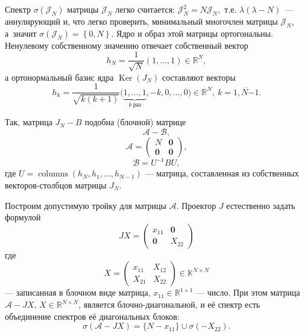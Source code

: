 \documentclass[12pt]{article}
\begin{document}
Спектр \( \sigma\left( \mathcal{J}_N \right) \)
    матрицы \( \mathcal{J}_N \) легко считается:
    \( \mathcal{J}_N^2 = N \mathcal{J}_N, \) т.е.
    \( \lambda(\lambda - N) \)~--- аннулирующий и, что легко проверить,
    минимальный многочлен матрицы \( \mathcal{J}_N \), а~значит
    \( \sigma\left( \mathcal{J}_N \right) = \left\{ 0,N \right\}. \)
Ядро и образ этой матрицы ортогональны.
Ненулевому собственному значению
    отвечает собственный вектор
    \[
        h_N = \frac{1}{\sqrt{N}}(1,\ldots, 1)\in\mathbb{R}^N,
        \]
    а ортонормальный базис ядра \( \operatorname{Ker}(J_N) \)
    составляют векторы
    \[
        h_k = \frac{1}{\sqrt{k(k+1)}}
        \big(\underbrace{1,\ldots, 1}_{k\ \text{раз}}, -k, 0, \ldots, 0\big)
        \in\mathbb{R}^N,
        \ k=\overline{1,N{-1}}.
        \]

Так, матрица \( J_N-B \) подобна (блочной) матрице
    \[
        \mathcal{A} - \mathcal{B}, \]
    \[
        \mathcal{A} = \left(\begin{array}{c|c}
        N & \mathbf{0} \\ \hline
        \mathbf{0} & \mathbf{0}
        \end{array}\right),
        \]
    \[
        \mathcal{B} = U^{-1}B U,
        \]
    где \( U=\operatorname{columns}(h_N, h_1, \ldots, h_{N-1}) \)
    --- матрица, составленная из собственных векторов-столбцов матрицы \( J_N \).

Построим допустимую тройку для матрицы \( \mathcal{A} \).
Проектор \( J \) естественно задать формулой
    \[
        JX =
        \left(\begin{array}{c|c}
        x_{11} & \mathbf{0} \\ \hline
        \mathbf{0} & X_{22}
        \end{array}\right)
        \]
где
    \[
        X =
        \left(\begin{array}{c|c}
        x_{11} & X_{12} \\ \hline
        X_{21} & X_{22}
        \end{array}\right)\in\mathbb{K}^{N{\times}N}
        \]
        --- записанная в блочном виде матрица,
        \( x_{11}\in\mathbb{R}^{1\times 1} \) --- число.
При этом матрица \( \mathcal{A} - JX \),
    \( X\in\mathbb{R}^{N{\times}N} \),
    является блочно-диагональной,
    и её спектр есть объединение спектров её диагональных блоков:
    \[
        \sigma(\mathcal{A} - JX)
        = \{ N - x_{11} \} \cup \sigma(-X_{22}).
        \]
\end{document}
